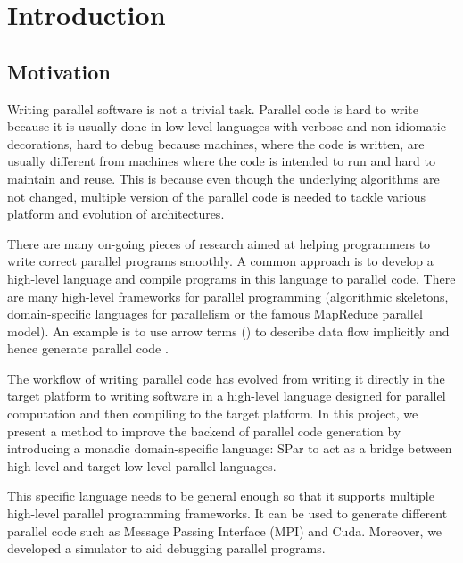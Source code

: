\tableofcontents
\chapter{Introduction} \label{chap:intro}

\section{Motivation} \label{i:m}
Writing parallel software is not a trivial task. Parallel code is hard to write because it is usually done in low-level languages with verbose and non-idiomatic decorations, hard to debug because machines, where the code is written, are usually different from machines where the code is intended to run and hard to maintain and reuse. This is because even though the underlying algorithms are not changed, multiple version of the parallel code is needed to tackle various platform and evolution of architectures.

There are many on-going pieces of research aimed at helping programmers to write correct parallel programs smoothly. A common approach is to develop a high-level language and compile programs in this language to parallel code. There are many high-level frameworks for parallel programming (\eg algorithmic skeletons\cite{coleAlgorithmicSkeletonsStructured}, domain-specific languages for parallelism\cite{brownHeterogeneousParallelFramework2011} or the famous MapReduce parallel model\cite{liMapReduceParallelProgramming2016}). An example is to use arrow terms () to describe data flow implicitly and hence generate parallel code \cite{braunArrowsParallelComputation2018}.

The workflow of writing parallel code has evolved from writing it directly in the target platform to writing software in a high-level language designed for parallel computation and then compiling to the target platform. In this project, we present a method to improve the backend of parallel code generation by introducing a monadic domain-specific language: SPar to act as a bridge between high-level and target low-level parallel languages.

This specific language needs to be general enough so that it supports multiple high-level parallel programming frameworks. It can be used to generate different parallel code such as Message Passing Interface (MPI) and Cuda. Moreover, we developed a simulator to aid debugging parallel programs.



